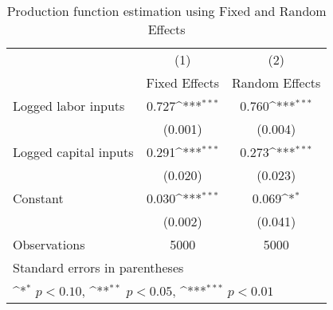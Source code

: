 \begin{table}[htbp]\centering
\def\sym#1{\ifmmode^{#1}\else\(^{#1}\)\fi}
\caption{Production function estimation using Fixed and Random Effects}
\begin{tabular}{l*{2}{c}}
\hline\hline
                &\multicolumn{1}{c}{(1)}&\multicolumn{1}{c}{(2)}\\
                &\multicolumn{1}{c}{Fixed Effects}&\multicolumn{1}{c}{Random Effects}\\
\hline
Logged labor inputs&    0.727\sym{***}&    0.760\sym{***}\\
                &  (0.001)         &  (0.004)         \\
Logged capital inputs&    0.291\sym{***}&    0.273\sym{***}\\
                &  (0.020)         &  (0.023)         \\
Constant        &    0.030\sym{***}&    0.069\sym{*}  \\
                &  (0.002)         &  (0.041)         \\
\hline
Observations    &     5000         &     5000         \\
\hline\hline
\multicolumn{3}{l}{\footnotesize Standard errors in parentheses}\\
\multicolumn{3}{l}{\footnotesize \sym{*} \(p<0.10\), \sym{**} \(p<0.05\), \sym{***} \(p<0.01\)}\\
\end{tabular}
\end{table}
